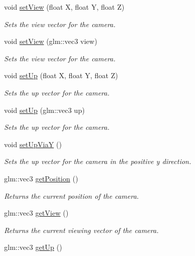 \begin{DoxyCompactItemize}
void \hyperlink{class_y_p_r_camera_a18213984138d7dd35a8434cf80b8acb0}{set\+View} (float X, float Y, float Z)
\begin{DoxyCompactList}\small\item\em Sets the view vector for the camera. \end{DoxyCompactList}\item 
void \hyperlink{class_y_p_r_camera_a9ec16fa6a9421d69fb97f66ee9ba7d03}{set\+View} (glm\+::vec3 view)
\begin{DoxyCompactList}\small\item\em Sets the view vector for the camera. \end{DoxyCompactList}\item 
void \hyperlink{class_y_p_r_camera_ae8ae30855f7d97e28f21c4d6b80104cc}{set\+Up} (float X, float Y, float Z)
\begin{DoxyCompactList}\small\item\em Sets the up vector for the camera. \end{DoxyCompactList}\item 
void \hyperlink{class_y_p_r_camera_ad3c0c7d126b03f4c2974cdbea1040ba4}{set\+Up} (glm\+::vec3 up)
\begin{DoxyCompactList}\small\item\em Sets the up vector for the camera. \end{DoxyCompactList}\item 
void \hyperlink{class_y_p_r_camera_a1f704e1375b335a01d6b8bb9affecce1}{set\+Up\+ViaY} ()
\begin{DoxyCompactList}\small\item\em Sets the up vector for the camera in the positive y direction. \end{DoxyCompactList}\item 
glm\+::vec3 \hyperlink{class_y_p_r_camera_a7a8964c4ec47fea7ffd7942449237788}{get\+Position} ()
\begin{DoxyCompactList}\small\item\em Returns the current position of the camera. \end{DoxyCompactList}\item 
glm\+::vec3 \hyperlink{class_y_p_r_camera_ad30888384ec6b348403c85ad0aef83c9}{get\+View} ()
\begin{DoxyCompactList}\small\item\em Returns the current viewing vector of the camera. \end{DoxyCompactList}\item 
glm\+::vec3 \hyperlink{class_y_p_r_camera_a3441eafb88882eb670d7eeb8bdc433fc}{get\+Up} ()

\end{DoxyCompactItemize}
